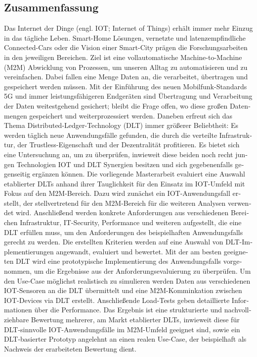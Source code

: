 \begin{otherlanguage}{ngerman}
	\chapter*{Zusammenfassung}
	Das Internet der Dinge (engl. IOT; Internet of Things) erhält immer mehr Einzug in das tägliche Leben. Smart-Home Lösungen, vernetzte und latenzempfindliche Connected-Cars oder die Vision einer Smart-City prägen die Forschungsarbeiten in den jeweiligen Bereichen. Ziel ist eine vollautomatische Machine-to-Machine (M2M) Abwicklung von Prozessen, um unseren Alltag zu automatisieren und zu vereinfachen. Dabei fallen eine Menge Daten an, die verarbeitet, übertragen und gespeichert werden müssen. Mit der Einführung des neuen Mobilfunk-Standards 5G und immer leistungsfähigeren Endgeräten sind Übertragung und Verarbeitung der Daten weitestgehend gesichert; bleibt die Frage offen, wo diese großen Datenmengen gespeichert und weiterprozessiert werden.
	Daneben erfreut sich das Thema Distributed-Ledger-Technology (DLT) immer größerer Beliebtheit: Es werden täglich neue Anwendungsfälle gefunden, die durch die verteilte Infrastruktur, der Trustless-Eigenschaft und der Dezentralität profitieren. Es bietet sich eine Untersuchung an, um zu überprüfen, inwieweit diese beiden noch recht jungen Technologien IOT und DLT Synergien besitzen und sich gegebenenfalls gegenseitig ergänzen können.
	Die vorliegende Masterarbeit evaluiert eine Auswahl etablierter DLTs anhand ihrer Tauglichkeit für den Einsatz im IOT-Umfeld mit Fokus auf den M2M-Bereich. Dazu wird zunächst ein IOT-Anwendungsfall erstellt, der stellvertretend für den M2M-Bereich für die weiteren Analysen verwendet wird. Anschließend werden konkrete Anforderungen aus verschiedenen Bereichen Infrastruktur, IT-Security, Performance und weiteren aufgestellt, die eine DLT erfüllen muss, um den Anforderungen des beispielhaften Anwendungsfalls gerecht zu werden. Die erstellten Kriterien werden auf eine Auswahl von DLT-Implementierungen angewandt, evaluiert und bewertet. Mit der am besten geeigneten DLT wird eine prototypische Implementierung des Anwendungsfalls vorgenommen, um die Ergebnisse aus der Anforderungsevaluierung zu überprüfen. Um den Use-Case möglichst realistisch zu simulieren werden Daten aus verschiedenen IOT-Sensoren an die DLT übermittelt und eine M2M-Komminkation zwischen IOT-Devices via DLT erstellt. Anschließende Load-Tests geben detaillierte Informationen über die Performance.
	Das Ergebnis ist eine strukturierte und nachvollziehbare Bewertung mehrerer, am Markt etablierter DLTs, inwieweit diese für DLT-sinnvolle IOT-Anwendungsfälle im M2M-Umfeld geeignet sind, sowie ein DLT-basierter Prototyp angelehnt an einen realen Use-Case, der beispielhaft als Nachweis der erarbeiteten Bewertung dient.


\end{otherlanguage}
